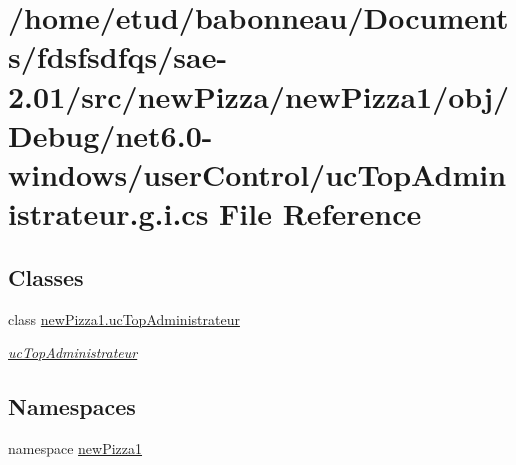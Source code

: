 \hypertarget{net6_80-windows_2userControl_2ucTopAdministrateur_8g_8i_8cs}{}\section{/home/etud/babonneau/\+Documents/fdsfsdfqs/sae-\/2.01/src/new\+Pizza/new\+Pizza1/obj/\+Debug/net6.0-\/windows/user\+Control/uc\+Top\+Administrateur.g.\+i.\+cs File Reference}
\label{net6_80-windows_2userControl_2ucTopAdministrateur_8g_8i_8cs}
\subsection*{Classes}
\begin{DoxyCompactItemize}
\item 
class \hyperlink{classnewPizza1_1_1ucTopAdministrateur}{new\+Pizza1.\+uc\+Top\+Administrateur}
\begin{DoxyCompactList}\small\item\em \hyperlink{classnewPizza1_1_1ucTopAdministrateur}{uc\+Top\+Administrateur} \end{DoxyCompactList}\end{DoxyCompactItemize}
\subsection*{Namespaces}
\begin{DoxyCompactItemize}
\item 
namespace \hyperlink{namespacenewPizza1}{new\+Pizza1}
\end{DoxyCompactItemize}
